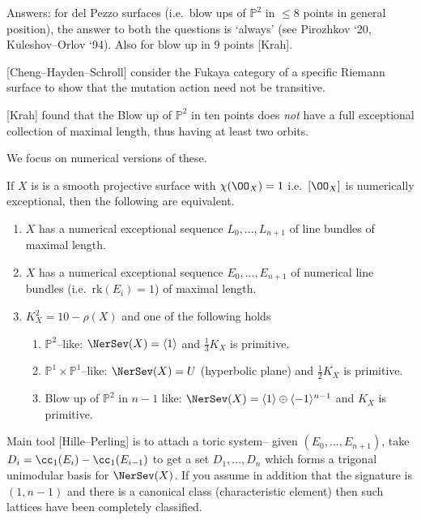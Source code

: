 Answers: for del Pezzo surfaces (i.e.\ blow ups of \(\mathbb{P}^2\) in \(\leq
8\) points in general position), the answer to both the questions is `always'
(see Pirozhkov `20, Kuleshov--Orlov `94). Also for blow up in 9 points [Krah].

[Cheng--Hayden--Schroll] consider the Fukaya category of a specific Riemann
surface to show that the mutation action need not be transitive.

[Krah] found that the Blow up of \(\mathbb{P}^2\) in ten points does \emph{not}
have a full exceptional collection of maximal length, thus having at least two
orbits.

We focus on numerical versions of these.

\begin{theorem}[(Vial)]
    If \(X\) is is a smooth projective surface with \(\chi(\OO_X)=1\) i.e.\
    \([\OO_X]\) is numerically exceptional, then the following are
    equivalent.
    \begin{enumerate}
        \item \(X\) has a numerical exceptional sequence \(L_0,...,L_{n+1}\) of
            line bundles of maximal length.
        \item \(X\) has a numerical exceptional sequence \(E_0,...,E_{n+1}\) of
            numerical line bundles (i.e.\ \(\text{rk}(E_i)=1\)) of maximal
            length.
        \item \(K_X^2=10-\rho(X)\) and one of the following holds
            \begin{enumerate}
                \item \(\mathbb{P}^2\)--like: \(\NerSev(X)=\langle 1 \rangle\)
                    and \(\frac{1}{3}K_X\) is primitive.
                \item \(\mathbb{P}^1\times \mathbb{P}^1\)--like:
                    \(\NerSev(X)=U\) (hyperbolic plane) and \(\frac{1}{2}K_X\)
                    is primitive.
                \item Blow up of \(\mathbb{P}^2\) in \(n-1\) like:
                    \(\NerSev(X)=\langle 1 \rangle \oplus \langle -1 \rangle
                    ^{n-1}\) and \(K_X\) is primitive.
            \end{enumerate}
    \end{enumerate}
\end{theorem}

Main tool [Hille--Perling] is to attach a toric system-- given
\((E_0,...,E_{n+1})\), take \(D_i=\cc_1(E_i)-\cc_1(E_{i-1})\) to get a set
\(D_1,...,D_n\) which forms a trigonal unimodular basis for \(\NerSev(X)\). If
you assume in addition that the signature is \((1,n-1)\) and there is a
canonical class (characteristic element) then such lattices have been completely
classified.

